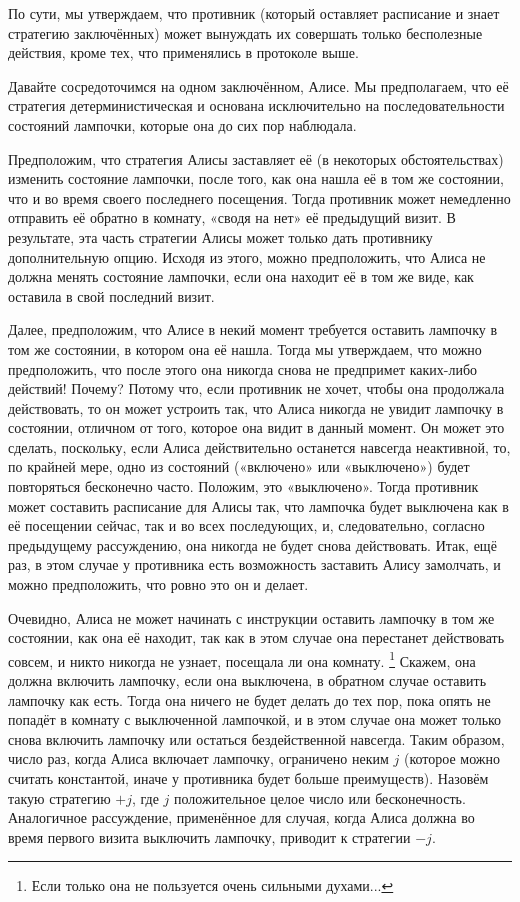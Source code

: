 По сути, мы утверждаем, что противник (который оставляет расписание и знает стратегию заключённых) может вынуждать их совершать только бесполезные действия, кроме тех, что применялись в протоколе выше.

Давайте сосредоточимся на одном заключённом, Алисе.
Мы предполагаем, что её стратегия детерминистическая и основана исключительно на последовательности состояний лампочки, которые она до сих пор наблюдала.

Предположим, что стратегия Алисы заставляет её (в некоторых обстоятельствах) изменить состояние лампочки, после того, как она нашла её в том же состоянии, что и во время своего последнего посещения.
Тогда противник может немедленно отправить её обратно в комнату, «сводя на нет» её предыдущий визит.
В результате, эта часть стратегии Алисы может только дать противнику дополнительную опцию.
Исходя из этого, можно предположить, что Алиса не должна менять состояние лампочки, если она находит её в том же виде, как оставила в свой последний визит.

Далее, предположим, что Алисе в некий момент требуется оставить лампочку в том же состоянии, в котором она её нашла.
Тогда мы утверждаем, что можно предположить, что после этого она никогда снова не предпримет каких-либо действий!
Почему?
Потому что, если противник не хочет, чтобы она продолжала действовать, то он может устроить так, что Алиса никогда не увидит лампочку в состоянии, отличном от того, которое она видит в данный момент.
Он может это сделать, поскольку, если Алиса действительно останется навсегда неактивной, то, по крайней мере, одно из состояний («включено» или «выключено») будет повторяться бесконечно часто.
Положим, это «выключено».
Тогда противник может составить расписание для Алисы так, что лампочка будет выключена как в её посещении сейчас, так и во всех последующих, и, следовательно, согласно предыдущему рассуждению, она никогда не будет снова действовать.
Итак, ещё раз, в этом случае у противника есть возможность заставить Алису замолчать, и можно предположить, что ровно это он и делает.

Очевидно, Алиса не может начинать с инструкции оставить лампочку в том же состоянии, как она её находит, так как в этом случае она перестанет действовать совсем, и никто никогда не узнает, посещала ли она комнату.%
\footnote{Если только она не пользуется очень сильными духами...}
Скажем, она должна включить лампочку, если она выключена, в обратном случае оставить лампочку как есть.
Тогда она ничего не будет делать до тех пор, пока опять не попадёт в комнату с выключенной лампочкой, и в этом случае она может только снова включить лампочку или остаться бездейственной навсегда.
Таким образом, число раз, когда Алиса включает лампочку, ограничено неким $j$ (которое можно считать константой, иначе у противника будет больше преимуществ).
Назовём такую стратегию $+j$, где $j$ положительное целое число или бесконечность.
Аналогичное рассуждение, применённое для случая, когда Алиса должна во время первого визита выключить лампочку, приводит к стратегии $-j$.

